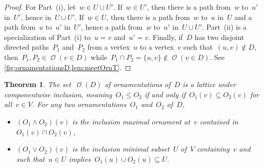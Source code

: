 \documentclass{amsart}
\newtheorem{theorem}{Theorem}[section]
\theoremstyle{definition}
\renewcommand{\c}[1]{\mathcal{#1}} %
\newcommand{\meet}{\wedge} %
\newcommand{\join}{\vee} %
\DeclareMathOperator{\Orn}{\c{O}}  %
\begin{document}
\begin{proof}
For Part~(i), let~$w \in U \cup U'$. If~$w \in U'$, then there is a path from~$w$ to~$u'$ in~$U'$, hence in~$U \cup U'$.
If~$w \in U$, then there is a path from~$w$ to~$u$ in~$U$ and a path from~$u$ to~$u'$ in~$U'$, hence a path from~$w$ to~$u'$ in~$U \cup U'$.
Part~(ii) is a specialization of Part~(i) to~$u = v$ and~$u' = v$.
Finally, if~$D$ has two disjoint directed paths~$P_1$ and~$P_2$ from a vertex~$u$ to a vertex~$v$ such that~$(u,v) \notin D$, then~$P_1, P_2 \in \Orn(v \in D)$ while~$P_1 \cap P_2 = \{u,v\} \notin \Orn(v \in D)$.
See \cref{fig:ornamentationsD,lem:meetOrnT}.
\end{proof}

\begin{theorem}
\label{thm:OrnMeetJoin}
The set~$\Orn(D)$ of ornamentations of~$D$ is a lattice under componentwise inclusion, meaning~$O_1 \le O_2$ if and only if~$O_1(v) \subseteq O_2(v)$ for all~$v \in V$.
For any two ornamentations~$O_1$ and~$O_2$ of~$D$,
\begin{itemize}
\item $(O_1 \meet O_2)(v)$ is the inclusion maximal ornament at~$v$ contained in~$O_1(v) \cap O_2(v)$,
\item $(O_1 \join O_2)(v)$ is the inclusion minimal subset~$U$ of~$V$ containing~$v$ and such that~$u \in U$ implies~$O_1(u) \cup O_2(u) \subseteq U$.
\end{itemize}
\end{theorem}
\end{document}
